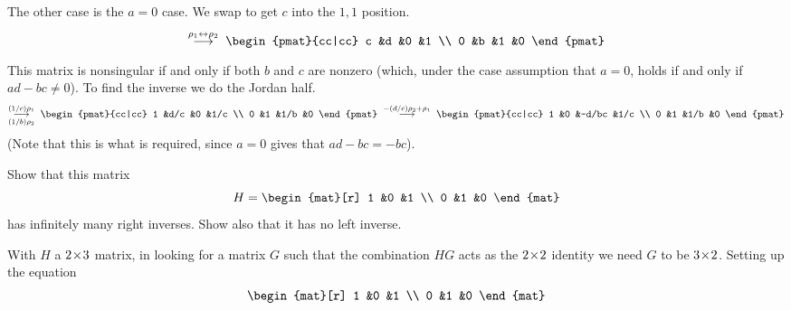 \begin{exercises}
\begin{answer}
      The other case is the \( a=0 \) case.
      We swap to get $c$ into the $1,1$ position.
      \begin{equation*}
        \grstep{\rho_1\leftrightarrow\rho_2}\;
        \begin{pmat}{cc|cc}
          c  &d  &0  &1  \\
          0  &b  &1  &0
        \end{pmat}
      \end{equation*}
      This matrix is nonsingular if and only if
      both \( b \) and \( c \) are nonzero
      (which, under the case assumption that \( a=0 \), 
      holds if and only if \( ad-bc\neq 0 \)).
      To find the inverse
      we do the Jordan half.
      \begin{equation*}
        \grstep[(1/b)\rho_2]{(1/c)\rho_1}\;
        \begin{pmat}{cc|cc}
          1  &d/c  &0       &1/c  \\
          0  &1    &1/b     &0
        \end{pmat}                        
        \;\grstep{-(d/c)\rho_2+\rho_1}\;
        \begin{pmat}{cc|cc}
          1  &0  &-d/bc  &1/c  \\
          0  &1  &1/b    &0
        \end{pmat}
      \end{equation*}
      (Note that this is what is required, since \( a=0 \) gives that
      \( ad-bc=-bc \)).
    \end{answer}
  \item 
    Show that this matrix 
    \begin{equation*}
      H=\begin{mat}[r]
          1  &0   &1  \\
          0  &1   &0
        \end{mat}
    \end{equation*}
    has infinitely many right inverses.
    Show also that it has no left inverse.
    \begin{answer}
      With $H$ a $2 \! \times \! 3$ matrix,
      in looking for a matrix $G$ such that the combination $HG$
      acts as the $2 \! \times \! 2$ identity we
      need $G$ to be $3 \! \times \! 2$. 
      Setting up the equation
      \begin{equation*}
          \begin{mat}[r]
             1  &0   &1  \\
             0  &1   &0
           \end{mat}

\end{equation*}
\end{answer}
\end{exercises}
